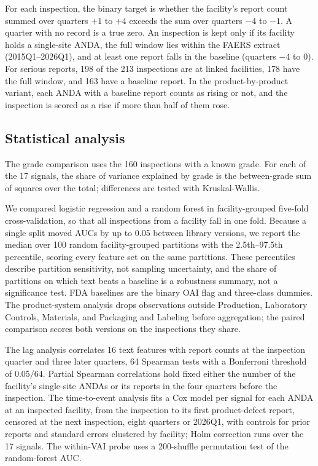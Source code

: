 \documentclass[12pt]{article}
\begin{document}
For each inspection, the binary target is whether the facility's report
count summed over quarters $+1$ to $+4$ exceeds the sum over quarters
$-4$ to $-1$. A quarter with no record is a true zero. An inspection is
kept only if its facility holds a single-site ANDA, the full window lies
within the FAERS extract (2015Q1--2026Q1), and at least one report falls in
the baseline (quarters $-4$ to $0$). For serious reports, 198 of the 213
inspections are at linked facilities, 178 have the full window, and 163
have a baseline report. In the product-by-product variant, each ANDA with a
baseline report counts as rising or not, and the inspection is scored as a
rise if more than half of them rose.

\subsection{Statistical analysis}

The grade comparison uses the 160 inspections with a known grade. For each
of the 17 signals, the share of variance explained by grade is the
between-grade sum of squares over the total; differences are tested with
Kruskal-Wallis.

We compared logistic regression and a random forest in facility-grouped
five-fold cross-validation, so that all inspections from a facility fall in
one fold. Because a single split moved AUCs by up to 0.05 between library
versions, we report the median over 100 random facility-grouped partitions
with the 2.5th--97.5th percentile, scoring every feature set on the same
partitions. These percentiles describe partition sensitivity, not sampling
uncertainty, and the share of partitions on which text beats a baseline is
a robustness summary, not a significance test. FDA baselines are the binary
OAI flag and three-class dummies. The product-system analysis drops
observations outside Production, Laboratory Controls, Materials, and
Packaging and Labeling before aggregation; the paired comparison scores
both versions on the inspections they share.

The lag analysis correlates 16 text features with report counts at the
inspection quarter and three later quarters, 64 Spearman tests with a
Bonferroni threshold of $0.05/64$. Partial Spearman correlations hold fixed
either the number of the facility's single-site ANDAs or its reports in
the four quarters before the inspection. The time-to-event analysis fits a
Cox model per signal for each ANDA at an inspected facility, from the
inspection to its first product-defect report, censored at the next
inspection, eight quarters or 2026Q1, with controls for prior reports and
standard errors clustered by facility; Holm correction runs over the 17
signals. The within-VAI probe uses a 200-shuffle permutation test of the
random-forest AUC.
\end{document}
